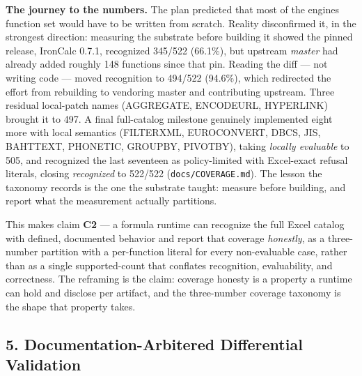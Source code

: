 \documentclass[
]{article}
\begin{document}
\textbf{The journey to the numbers.} The plan predicted that most of the
engine\textquotesingle s function set would have to be written from
scratch. Reality disconfirmed it, in the strongest direction: measuring
the substrate before building it showed the pinned release, IronCalc
0.7.1, recognized 345/522 (66.1\%), but upstream \emph{master} had
already added roughly 148 functions since that pin. Reading the diff ---
not writing code --- moved recognition to 494/522 (94.6\%), which
redirected the effort from rebuilding to vendoring master and
contributing upstream. Three residual local-patch names (AGGREGATE,
ENCODEURL, HYPERLINK) brought it to 497. A final full-catalog milestone
genuinely implemented eight more with local semantics (FILTERXML,
EUROCONVERT, DBCS, JIS, BAHTTEXT, PHONETIC, GROUPBY, PIVOTBY), taking
\emph{locally evaluable} to 505, and recognized the last seventeen as
policy-limited with Excel-exact refusal literals, closing
\emph{recognized} to 522/522 (\texttt{docs/COVERAGE.md}). The lesson the
taxonomy records is the one the substrate taught: measure before
building, and report what the measurement actually partitions.

This makes claim \textbf{C2} --- a formula runtime can recognize the
full Excel catalog with defined, documented behavior and report that
coverage \emph{honestly}, as a three-number partition with a
per-function literal for every non-evaluable case, rather than as a
single supported-count that conflates recognition, evaluability, and
correctness. The reframing is the claim: coverage honesty is a property
a runtime can hold and disclose per artifact, and the three-number
coverage taxonomy is the shape that property takes.

\subsection{5. Documentation-Arbitered Differential
Validation}\label{5-documentation-arbitered-differential-validation}
\end{document}
